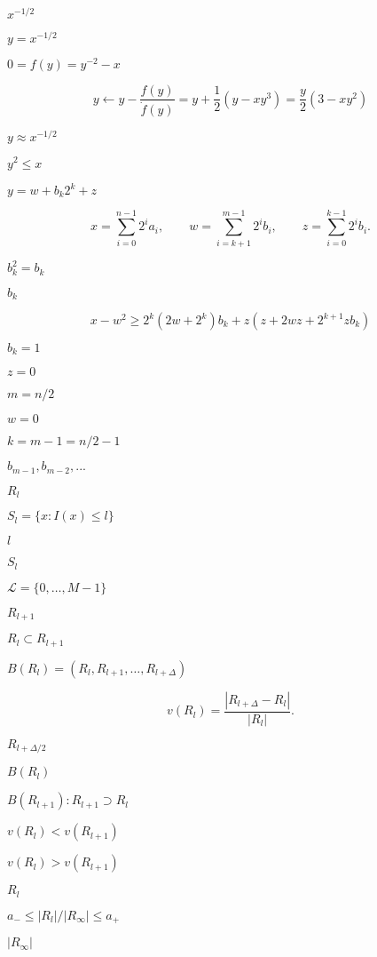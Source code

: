 \documentclass{article}
\begin{document}
$ x^{-1/2} $
\pagebreak

$ y = x^{-1/2} $
\pagebreak

$ 0 = f(y) = y^{-2} - x$
\pagebreak

\[ y \leftarrow y - \frac{f(y)}{\dot f(y)} = y + \frac{1}{2} (y-xy^3) = \frac{y}{2} \left( 3 - xy^2 \right) \]
\pagebreak

$ y \approx x^{-1/2} $
\pagebreak

$ y^2 \leq x $
\pagebreak

$ y = w + b_k 2^k + z $
\pagebreak

\[ x = \sum_{i=0}^{n-1} 2^i a_i, \qquad w = \sum_{i=k+1}^{m-1} 2^i b_i, \qquad z = \sum_{i=0}^{k-1} 2^i b_i. \]
\pagebreak

$ b_k^2=b_k $
\pagebreak

$ b_k $
\pagebreak

\[ x - w^2 \geq 2^k ( 2 w + 2^k ) b_k + z (z + 2wz + 2^{k+1}z b_k) \]
\pagebreak

$ b_k = 1 $
\pagebreak

$ z = 0 $
\pagebreak

$ m = n / 2 $
\pagebreak

$ w = 0 $
\pagebreak

$ k = m - 1 = n/2 - 1 $
\pagebreak

$ b_{m-1}, b_{m-2}, ... $
\pagebreak

$R_l$
\pagebreak

$S_l = \{ x : I(x) \leq l \}$
\pagebreak

$l$
\pagebreak

$S_l$
\pagebreak

$\mathcal{L}=\{0,\dots,M-1\}$
\pagebreak

$R_{l+1}$
\pagebreak

$R_l\subset R_{l+1}$
\pagebreak

$B(R_l)=(R_l,R_{l+1},\dots,R_{l+\Delta})$
\pagebreak

\[ v(R_l) = \frac{|R_{l+\Delta} - R_l|}{|R_l|}. \]
\pagebreak

$R_{l+\Delta/2}$
\pagebreak

$B(R_{l})$
\pagebreak

$B(R_{l+1}):R_{l+1}\supset R_l$
\pagebreak

$v(R_l)<v(R_{l+1})$
\pagebreak

$v(R_l)>v(R_{l+1})$
\pagebreak

$R_{l}$
\pagebreak

$a_- \leq |R_{l}|/|R_{\infty}| \leq a_+$
\pagebreak

$|R_{\infty}|$
\pagebreak
\end{document}
